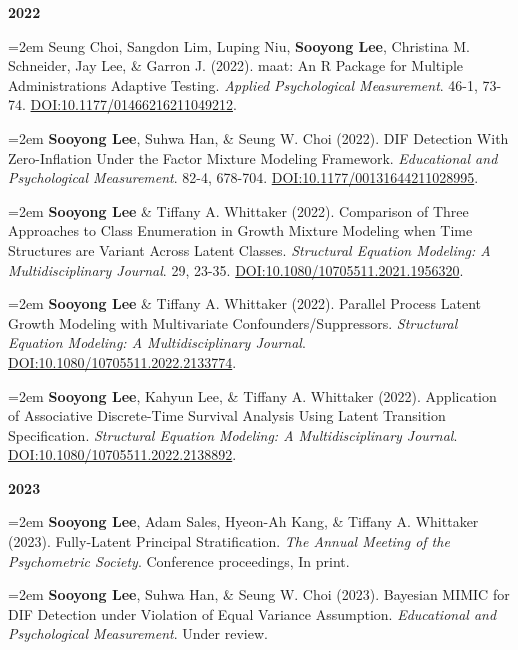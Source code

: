 \documentclass[11pt,letterpaper,]{awesome-me}
\begin{document}
\setlength{\leftskip}{0cm}

\textbf{2022}

\setlength{\leftskip}{0.5cm}

\hangindent=2em  Seung Choi, Sangdon Lim, Luping Niu,
\textbf{Sooyong Lee}, Christina M. Schneider, Jay Lee, \& Garron J.
(2022). maat: An R Package for Multiple Administrations Adaptive
Testing. \emph{Applied Psychological Measurement}. 46-1, 73-74.
\url{DOI:10.1177/01466216211049212}.

\hangindent=2em  \textbf{Sooyong Lee}, Suhwa Han, \& Seung
W. Choi (2022). DIF Detection With Zero-Inflation Under the Factor
Mixture Modeling Framework. \emph{Educational and Psychological
Measurement}. 82-4, 678-704. \url{DOI:10.1177/00131644211028995}.

\hangindent=2em  \textbf{Sooyong Lee} \& Tiffany A.
Whittaker (2022). Comparison of Three Approaches to Class Enumeration in
Growth Mixture Modeling when Time Structures are Variant Across Latent
Classes. \emph{Structural Equation Modeling: A Multidisciplinary
Journal}. 29, 23-35. \url{DOI:10.1080/10705511.2021.1956320}.

\hangindent=2em  \textbf{Sooyong Lee} \& Tiffany A.
Whittaker (2022). Parallel Process Latent Growth Modeling with
Multivariate Confounders/Suppressors. \emph{Structural Equation
Modeling: A Multidisciplinary Journal}.
\url{DOI:10.1080/10705511.2022.2133774}.

\hangindent=2em  \textbf{Sooyong Lee}, Kahyun Lee, \&
Tiffany A. Whittaker (2022). Application of Associative Discrete-Time
Survival Analysis Using Latent Transition Specification.
\emph{Structural Equation Modeling: A Multidisciplinary Journal}.
\url{DOI:10.1080/10705511.2022.2138892}.

\setlength{\leftskip}{0cm}

\textbf{2023}

\setlength{\leftskip}{0.5cm}

\hangindent=2em  \textbf{Sooyong Lee}, Adam Sales, Hyeon-Ah
Kang, \& Tiffany A. Whittaker (2023). Fully-Latent Principal
Stratification. \emph{The Annual Meeting of the Psychometric Society}.
Conference proceedings, In print.

\hangindent=2em  \textbf{Sooyong Lee}, Suhwa Han, \& Seung
W. Choi (2023). Bayesian MIMIC for DIF Detection under Violation of
Equal Variance Assumption. \emph{Educational and Psychological
Measurement}. Under review.
\end{document}
